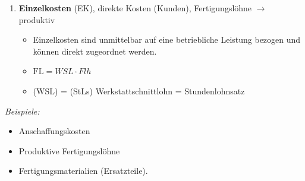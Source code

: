 \begin{enumerate}
\item
  \textbf{Einzelkosten} (EK), direkte Kosten (Kunden), Fertigungslöhne
  $\to$ produktiv

  \begin{itemize}
  \item
    Einzelkosten sind unmittelbar auf eine betriebliche Leistung bezogen
    und können direkt zugeordnet werden.
  \item
    $\boxed{\text{FL} = WSL \cdot Flh}$\\
  \item
    (WSL) = (StLs) Werkstattschnittlohn = Stundenlohnsatz
  \end{itemize}
\end{enumerate}

\emph{Beispiele:}

\begin{itemize}
\item
  Anschaffungskosten
\item
  Produktive Fertigungslöhne
\item
  Fertigungsmaterialien (Ersatzteile).
\end{itemize}

